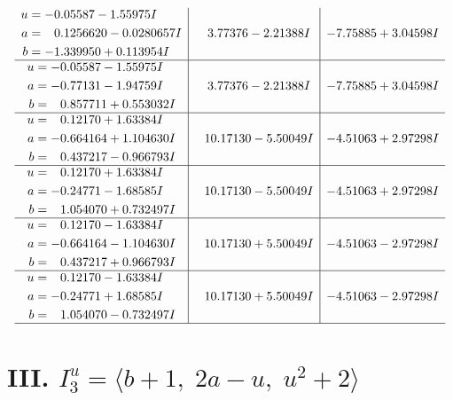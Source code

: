\documentclass[1p]{elsarticle_modified}
\theoremstyle{definition}
\begin{document}
$$\begin{array}{c|c|c}
\begin{aligned}
u &= -0.05587 - 1.55975 I \\
a &= \phantom{-}0.1256620 - 0.0280657 I \\
b &= -1.339950 + 0.113954 I\end{aligned}
 & \phantom{-}3.77376 - 2.21388 I & -7.75885 + 3.04598 I \\ \hline\begin{aligned}
u &= -0.05587 - 1.55975 I \\
a &= -0.77131 - 1.94759 I \\
b &= \phantom{-}0.857711 + 0.553032 I\end{aligned}
 & \phantom{-}3.77376 - 2.21388 I & -7.75885 + 3.04598 I \\ \hline\begin{aligned}
u &= \phantom{-}0.12170 + 1.63384 I \\
a &= -0.664164 + 1.104630 I \\
b &= \phantom{-}0.437217 - 0.966793 I\end{aligned}
 & \phantom{-}10.17130 - 5.50049 I & -4.51063 + 2.97298 I \\ \hline\begin{aligned}
u &= \phantom{-}0.12170 + 1.63384 I \\
a &= -0.24771 - 1.68585 I \\
b &= \phantom{-}1.054070 + 0.732497 I\end{aligned}
 & \phantom{-}10.17130 - 5.50049 I & -4.51063 + 2.97298 I \\ \hline\begin{aligned}
u &= \phantom{-}0.12170 - 1.63384 I \\
a &= -0.664164 - 1.104630 I \\
b &= \phantom{-}0.437217 + 0.966793 I\end{aligned}
 & \phantom{-}10.17130 + 5.50049 I & -4.51063 - 2.97298 I \\ \hline\begin{aligned}
u &= \phantom{-}0.12170 - 1.63384 I \\
a &= -0.24771 + 1.68585 I \\
b &= \phantom{-}1.054070 - 0.732497 I\end{aligned}
 & \phantom{-}10.17130 + 5.50049 I & -4.51063 - 2.97298 I\\
 \hline 
 \end{array}$$\newpage\newpage\renewcommand{\arraystretch}{1}
\centering \section*{III. $I^u_{3}= \langle b+1,\;2 a- u,\;u^2+2 \rangle$}
\end{document}
